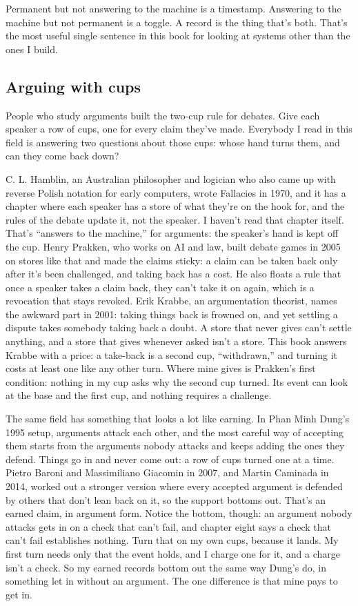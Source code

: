 \documentclass[11pt,twoside]{article}
\theoremstyle{thielethm}
\theoremstyle{thieledef}
\theoremstyle{thieledef}
\theoremstyle{thieledef}
\theoremstyle{thielethm}
\theoremstyle{thieleobs}
\theoremstyle{thielethm}
\begin{document}
Permanent but not answering to the machine is a timestamp. Answering to the machine but not permanent is a toggle. A record is the thing that's both. That's the most useful single sentence in this book for looking at systems other than the ones I build.

\subsection{Arguing with cups}

People who study arguments built the two-cup rule for debates. Give each speaker a row of cups, one for every claim they've made. Everybody I read in this field is answering two questions about those cups: whose hand turns them, and can they come back down?

C. L. Hamblin, an Australian philosopher and logician who also came up with reverse Polish notation for early computers, wrote Fallacies in 1970, and it has a chapter where each speaker has a store of what they're on the hook for, and the rules of the debate update it, not the speaker. I haven't read that chapter itself. That's ``answers to the machine,'' for arguments: the speaker's hand is kept off the cup. Henry Prakken, who works on AI and law, built debate games in 2005 on stores like that and made the claims sticky: a claim can be taken back only after it's been challenged, and taking back has a cost. He also floats a rule that once a speaker takes a claim back, they can't take it on again, which is a revocation that stays revoked. Erik Krabbe, an argumentation theorist, names the awkward part in 2001: taking things back is frowned on, and yet settling a dispute takes somebody taking back a doubt. A store that never gives can't settle anything, and a store that gives whenever asked isn't a store. This book answers Krabbe with a price: a take-back is a second cup, ``withdrawn,'' and turning it costs at least one like any other turn. Where mine gives is Prakken's first condition: nothing in my cup asks why the second cup turned. Its event can look at the base and the first cup, and nothing requires a challenge.

The same field has something that looks a lot like earning. In Phan Minh Dung's 1995 setup, arguments attack each other, and the most careful way of accepting them starts from the arguments nobody attacks and keeps adding the ones they defend. Things go in and never come out: a row of cups turned one at a time. Pietro Baroni and Massimiliano Giacomin in 2007, and Martin Caminada in 2014, worked out a stronger version where every accepted argument is defended by others that don't lean back on it, so the support bottoms out. That's an earned claim, in argument form. Notice the bottom, though: an argument nobody attacks gets in on a check that can't fail, and chapter eight says a check that can't fail establishes nothing. Turn that on my own cups, because it lands. My first turn needs only that the event holds, and I charge one for it, and a charge isn't a check. So my earned records bottom out the same way Dung's do, in something let in without an argument. The one difference is that mine pays to get in.
\end{document}
